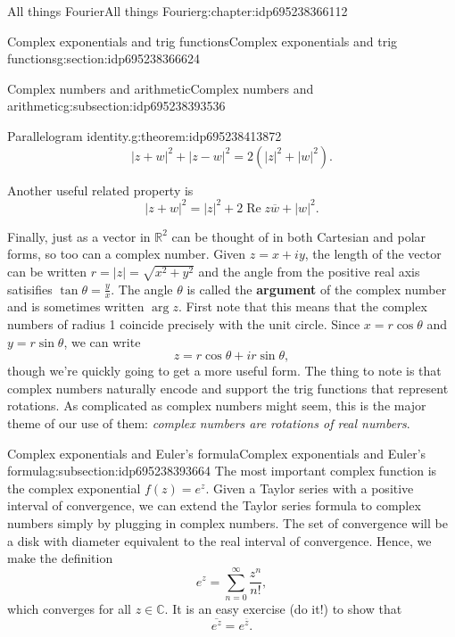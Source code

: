 \documentclass[oneside,10pt,]{book}
\newcommand{\terminology}[1]{\textbf{#1}}
\numberwithin{equation}{section}
\DeclareMathOperator{\RE}{Re}
\newcommand{\C}{\mathbb{C}}
\newcommand{\R}{\mathbb{R}}
\newcommand{\cc}[1]{\overline{#1}}
\newcommand{\abs}[1]{\left\vert#1\right\vert}
\numberwithin{equation}{section}
\begin{document}
\begin{chapterptx}{All things Fourier}{}{All things Fourier}{}{}{g:chapter:idp695238366112}
\begin{sectionptx}{Complex exponentials and trig functions}{}{Complex exponentials and trig functions}{}{}{g:section:idp695238366624}
\begin{subsectionptx}{Complex numbers and arithmetic}{}{Complex numbers and arithmetic}{}{}{g:subsection:idp695238393536}
\begin{theorem}{Parallelogram identity.}{}{g:theorem:idp695238413872}
\begin{equation*}
\abs{z + w}^2 + \abs{z - w}^2 = 2(\abs{z}^2 + \abs{w}^2).
\end{equation*}
%
\end{theorem}
Another useful related property is%
\begin{equation*}
\abs{z + w}^2 = \abs{z}^2 + 2\RE z\cc{w} + \abs{w}^2.
\end{equation*}
%
\par
Finally, just as a vector in \(\R^2\) can be thought of in both Cartesian and polar forms, so too can a complex number. Given \(z = x + iy\), the length of the vector can be written \(r = \abs{z} = \sqrt{x^2 + y^2}\) and the angle from the positive real axis satisifies \(\tan \theta = \frac{y}{x}\). The angle \(\theta\) is called the \terminology{argument} of the complex number and is sometimes written \(\arg z\). First note that this means that the complex numbers of radius 1 coincide precisely with the unit circle. Since \(x = r \cos \theta\) and \(y = r \sin \theta\), we can write%
\begin{equation*}
z = r\cos\theta + i r \sin \theta,
\end{equation*}
though we're quickly going to get a more useful form. The thing to note is that complex numbers naturally encode and support the trig functions that represent rotations. As complicated as complex numbers might seem, this is the major theme of our use of them: \emph{complex numbers are rotations of real numbers}.%
\end{subsectionptx}
%
%
\typeout{************************************************}
\typeout{************************************************}
%
\begin{subsectionptx}{Complex exponentials and Euler's formula}{}{Complex exponentials and Euler's formula}{}{}{g:subsection:idp695238393664}
The most important complex function is the complex exponential \(f(z) = e^z\).  Given a Taylor series with a positive interval of convergence, we can extend the Taylor series formula to complex numbers simply by plugging in complex numbers. The set of convergence will be a disk with diameter equivalent to the real interval of convergence. Hence, we make the definition%
\begin{equation*}
e^z = \sum_{n=0}^\infty \frac{z^n}{n!},
\end{equation*}
which converges for all \(z \in \C\). It is an easy exercise (do it!) to show that%
\begin{equation*}
\cc{e^z} = e^{\cc{z}}.

\end{equation*}
\end{subsectionptx}
\end{sectionptx}
\end{chapterptx}
\end{document}
